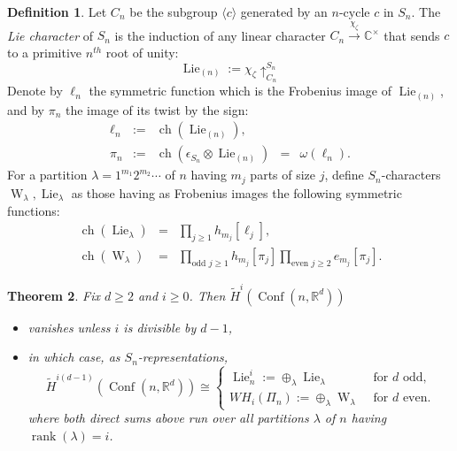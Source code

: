\documentclass[12pt]{amsart}
\theoremstyle{plain}
\newtheorem{thm}{Theorem}[section]
\theoremstyle{definition}
\newtheorem{defn}[thm]{Definition}
\begin{document}
\begin{defn}
\label{higher-Lie-and-Whitney-defn}
Let $C_n$ be the subgroup $\langle c \rangle$ generated by an $n$-cycle $c$ in $S_n$.
The {\it Lie character} of $S_n$ is the induction of any
linear character $C_n \overset{\chi_\zeta}{\longrightarrow} {{\mathbb C}}^\times$
that sends $c$ to a primitive $n^{th}$ root of unity:
\begin{equation}
\label{higher-Lie-defn}
{{\operatorname{Lie}}}_{(n)}:=\chi_\zeta \uparrow_{C_n}^{S_n}
\end{equation}
Denote by $\ell_n$ the symmetric function which is the 
Frobenius image of ${{\operatorname{Lie}}}_{(n)}$, and by $\pi_n$ the image of 
its twist by the sign:
$$
\begin{array}{rllll}
\ell_n &:=& {{\operatorname{ch}}}({{\operatorname{Lie}}}_{(n)}),& &\\
\pi_n &:=& {{\operatorname{ch}}}(\epsilon_{S_n} \otimes {{\operatorname{Lie}}}_{(n)}) &=& \omega(\ell_n).
\end{array}
$$
For a partition $\lambda=1^{m_1} 2^{m_2} \cdots$ of $n$ having $m_j$ parts of size $j$, define $S_n$-characters ${{\operatorname{W}}}_\lambda, {{\operatorname{Lie}}}_\lambda$ as
those having as Frobenius images the following symmetric functions:
\begin{eqnarray}
\label{Lie-character-expression}
{{\operatorname{ch}}} ({{\operatorname{Lie}}}_\lambda)&=&
\displaystyle \prod_{j \geq 1} h_{m_j}[\ell_j],\\
\label{equivariant-Whitney-homology-expression}
{{\operatorname{ch}}} ({{\operatorname{W}}}_\lambda)&=&
\displaystyle \prod_{\text{odd } j \geq 1} h_{m_j}[\pi_j]
\prod_{\text{even } j \geq 2} e_{m_j}[\pi_j].
\end{eqnarray}
\end{defn}

\begin{thm}{\cite[Thm. 4.4(iii)]{SundaramWelker}}
\label{Sundaram-Welker-thm}
Fix $d \geq 2$ and $i \geq 0$.  Then $\tilde{H}^i({{\operatorname{Conf}}}(n,{{\mathbb{R}}}^d))$ 
\begin{itemize}
\item vanishes unless $i$ is divisible by $d-1$, 
\item in which case, 
as $S_n$-representations,
$$
\tilde{H}^{i(d-1)}({{\operatorname{Conf}}}(n,{{\mathbb{R}}}^d))
\cong
\begin{cases}
\displaystyle {{\operatorname{Lie}}}^i_n:=\oplus_{\lambda} {{\operatorname{Lie}}}_\lambda 
  & \text{ for }d\text{ odd},\\
\displaystyle WH_i(\Pi_n):=\oplus_{\lambda} {{\operatorname{W}}}_\lambda 
  & \text{ for }d\text{ even}.
\end{cases}
$$
where both direct sums above run over all partitions $\lambda$ of $n$ 
having ${{\operatorname{rank}}}(\lambda)=i$.
\end{itemize}
\end{thm}
\end{document}
